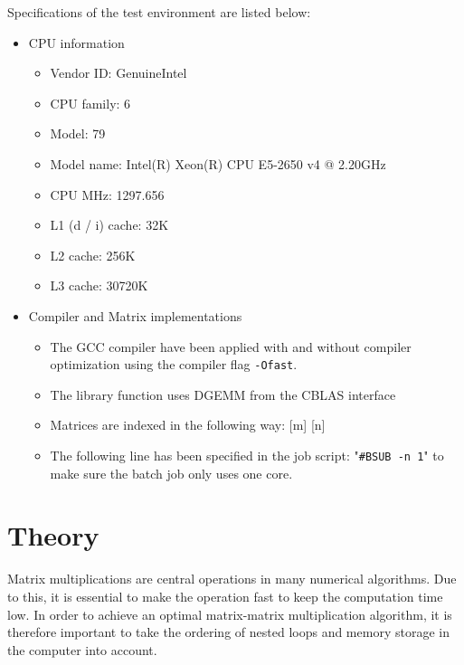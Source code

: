 Specifications of the test environment are listed below:
\begin{itemize}
\item CPU information
\begin{itemize}
\item Vendor ID:             GenuineIntel
\item CPU family:            6
\item Model:                 79
\item Model name:            Intel(R) Xeon(R) CPU E5-2650 v4 @ 2.20GHz
\item CPU MHz:               1297.656
\item L1 (d / i) cache:             32K
\item L2 cache:              256K
\item L3 cache:              30720K
\end{itemize}
\item Compiler and Matrix implementations
\begin{itemize}
\item The GCC compiler have been applied with and without compiler optimization using the compiler flag \texttt{-Ofast}. 
\item The library function uses DGEMM from the CBLAS interface
\item Matrices are indexed in the following way: [m] [n]
\item The following line has been specified in the job script: "\texttt{\#BSUB -n 1}" to make sure the batch job only uses one core.
\end{itemize}
\end{itemize}


\section{Theory}
Matrix multiplications are central operations in many numerical algorithms. Due to this, it is essential to make the operation fast to keep the computation time low. In order to achieve an optimal matrix-matrix multiplication algorithm, it is therefore important to take the ordering of nested loops and memory storage in the computer into account.\\


